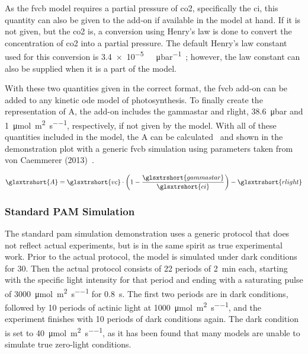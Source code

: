 As the \gls{fvcb} model requires a partial pressure of \gls{co2}, specifically the \gls{ci}, this quantity can also be given to the add-on if available in the model at hand. If it is not given, but the \gls{co2} is, a conversion using Henry's law is done to convert the concentration of \gls{co2} into a partial pressure. The default Henry's law constant used for this conversion is \qty{3.4e-5}{\milli\molar\per\micro\bar}~\cite{sanderCompilationHenrysLaw2023}; however, the law constant can also be supplied when it is a part of the model.

With these two quantities given in the correct format, the \gls{fvcb} add-on can be added to any kinetic \gls{ode} model of photosynthesis. To finally create the representation of \gls{A}, the add-on includes the \gls{gammastar} and \gls{rlight}, \qty{38.6}{\micro\bar} and \qty{1}{\micro\mol\per\square\meter\per\second}, respectively, if not given by the model. With all of these quantities included in the model, the \gls{A} can be calculated~ and shown in the demonstration plot with a generic \gls{fvcb} simulation using parameters taken from von Caemmerer (2013)~\cite{voncaemmererSteadystateModelsPhotosynthesis2013}.

\begin{equation}
  \label{eq:fvcb}
  \glsxtrshort{A} = \glsxtrshort{vc} \cdot \left( 1 - \frac{\glsxtrshort{gammastar}}{\glsxtrshort{ci}} \right) - \glsxtrshort{rlight}
\end{equation}

\subsubsection{Standard PAM Simulation}
The standard \gls{pam} simulation demonstration uses a generic protocol that does not reflect actual experiments, but is in the same spirit as true experimental work. Prior to the actual protocol, the model is simulated under dark conditions for \qty{30}{\min}. Then the actual protocol consists of 22 periods of \qty{2}{min} each, starting with the specific light intensity for that period and ending with a saturating pulse of \qty{3000}{\micro\mol\per\square\meter\per\second} for \qty{0.8}{\second}. The first two periods are in dark conditions, followed by 10 periods of actinic light at \qty{1000}{\micro\mol\per\square\meter\per\second}, and the experiment finishes with 10 periods of dark conditions again. The dark condition is set to \qty{40}{\micro\mol\per\square\meter\per\second}, as it has been found that many models are unable to simulate true zero-light conditions.

